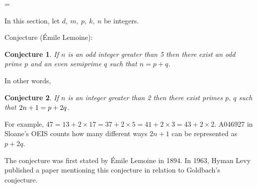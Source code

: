 \documentclass[12pt]{article}
\newtheorem{conjecture}{Conjecture}
\begin{document}
\parskip =\baselineskip
	
	
\begin{cnl}
		
		
\bigskip
		

		
In this section, let $d,\ m,\ p,\ k,\ n$ be integers.
		
		






\begin{remark}
Conjecture (\'Emile Lemoine): 
\end{remark}

\begin{conjecture}
If $n$ is an odd integer greater than 5 then there exist 
an odd prime $p$ and an even semiprime $q$ such that $n=p+q$. 
\end{conjecture}

\begin{remark}
In other words, 
\end{remark}

\begin{conjecture}
If $n$ is an integer greater than 2 then there exist primes 
$p,\ q$ such that $2\*n + 1 = p + 2\*q$. 
\end{conjecture}

\begin{remark}

For example, $47 = 13 + 2 \times 17 = 37 + 2 \times 5 = 
41 + 2 \times 3 = 43 + 2 \times 2$. A046927 in Sloane's OEIS counts
how many different ways $2n + 1$ can be represented as $p + 2q$.

The conjecture was first stated by \'Emile Lemoine in 1894. In 1963, 
Hyman Levy published a paper mentioning this conjecture in relation 
to Goldbach's conjecture.
\end{remark}

\end{cnl}
\end{document}
